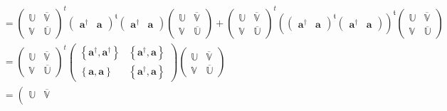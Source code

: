 \documentclass[aps, preprint]{revtex4}
\begin{document}
\begin{align}
 &  =\left (\begin{array}{cc}\mathbb{U} & \overline{\mathbb{V}} \\
\mathbb{V} & \overline{\mathbb{U}}\end{array}\right )^{t} \left (\begin{array}{cc}\mathbf{a}^{ \dag } & \mathbf{a}\end{array}\right )^{\mathfrak{t}} \left (\begin{array}{cc}\mathbf{a}^{ \dag } & \mathbf{a}\end{array}\right ) \left (\begin{array}{cc}\mathbb{U} & \overline{\mathbb{V}} \\
\mathbb{V} & \overline{\mathbb{U}}\end{array}\right ) +\left (\begin{array}{cc}\mathbb{U} & \overline{\mathbb{V}} \\
\mathbb{V} & \overline{\mathbb{U}}\end{array}\right )^{t} \left (\left (\begin{array}{cc}\mathbf{a}^{ \dag } & \mathbf{a}\end{array}\right )^{\mathfrak{t}} \left (\begin{array}{cc}\mathbf{a}^{ \dag } & \mathbf{a}\end{array}\right )\right )^{\mathfrak{t}} \left (\begin{array}{cc}\mathbb{U} & \overline{\mathbb{V}} \\
\mathbb{V} & \overline{\mathbb{U}}\end{array}\right ) \nonumber  \\
 &  =\left (\begin{array}{cc}\mathbb{U} & \overline{\mathbb{V}} \\
\mathbb{V} & \overline{\mathbb{U}}\end{array}\right )^{t} \left (\begin{array}{cc}\left \{\mathbf{a}^{ \dag } ,\mathbf{a}^{ \dag }\right \} & \left \{\mathbf{a}^{ \dag } ,\mathbf{a}\right \} \\
\left \{\mathbf{a} ,\mathbf{a}\right \} & \left \{\mathbf{a}^{ \dag } ,\mathbf{a}\right \}\end{array}\right ) \left (\begin{array}{cc}\mathbb{U} & \overline{\mathbb{V}} \\
\mathbb{V} & \overline{\mathbb{U}}\end{array}\right ) \nonumber  \\
 &  =\left (\begin{array}{cc}\mathbb{U} & \overline{\mathbb{V}} \\

\end{array}
\end{align}
\end{document}
